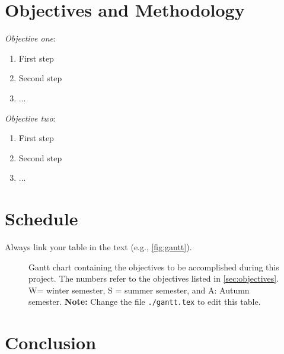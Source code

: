 \documentclass[10pt,letterpaper,oneside]{article}
\begin{document}
\lightlipsum[1-2]

\section{Objectives and Methodology}
\label{sec:objectives}

\emph{Objective one}:

\begin{enumerate}[{1.}1]
\item First step
\item Second step
\item ...
\end{enumerate}

\emph{Objective two}:

\begin{enumerate}[{2.}1]
\item First step
\item Second step
\item ...
\end{enumerate}

\section{Schedule}

Always link your table in the text (e.g., \autoref{fig:gantt}).

\lightlipsum[1]


\begin{figure}[htbp]
  \centering
  
    \caption{%
  Gantt chart containing the objectives to be accomplished during this project.
  The numbers refer to the objectives listed in \autoref{sec:objectives}.
  W= winter semester, S = summer semester, and A: Autumn semester.
  \textbf{Note:} Change the file \texttt{./gantt.tex} to edit this table.
  }
  \label{}
\end{figure}

\section{Conclusion}

\lightlipsum[1]

\printbibliography
\end{document}
